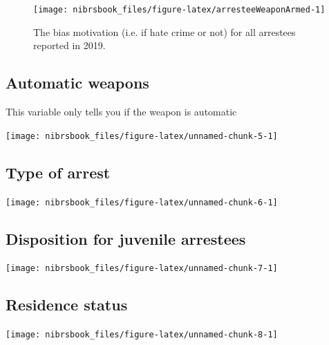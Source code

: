 \documentclass[
  12pt,
  openany]{book}
\begin{document}
\begin{figure}

{\centering \texttt{[image: nibrsbook\_files/figure-latex/arresteeWeaponArmed-1]} 

}

\caption{The bias motivation (i.e. if hate crime or not) for all arrestees reported in 2019.}\label{fig:arresteeWeaponArmed}
\end{figure}

\hypertarget{automatic-weapons-1}{%
\subsection{Automatic weapons}\label{automatic-weapons-1}}

This variable only tells you if the weapon is automatic

\begin{center}\texttt{[image: nibrsbook\_files/figure-latex/unnamed-chunk-5-1]} \end{center}

\hypertarget{type-of-arrest}{%
\subsection{Type of arrest}\label{type-of-arrest}}

\begin{center}\texttt{[image: nibrsbook\_files/figure-latex/unnamed-chunk-6-1]} \end{center}

\hypertarget{disposition-for-juvenile-arrestees}{%
\subsection{Disposition for juvenile arrestees}\label{disposition-for-juvenile-arrestees}}

\begin{center}\texttt{[image: nibrsbook\_files/figure-latex/unnamed-chunk-7-1]} \end{center}

\hypertarget{residence-status-1}{%
\subsection{Residence status}\label{residence-status-1}}

\begin{center}\texttt{[image: nibrsbook\_files/figure-latex/unnamed-chunk-8-1]} \end{center}
\end{document}

